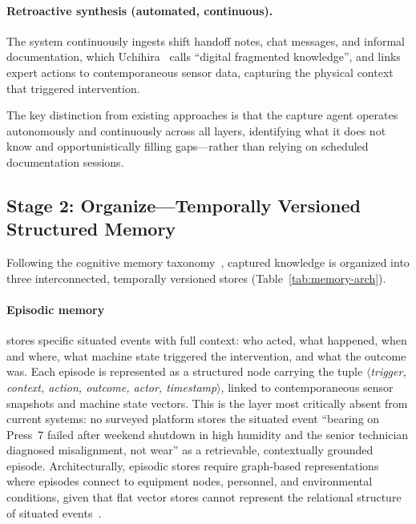 \documentclass[]{ceurart}
\begin{document}
\paragraph{Retroactive synthesis (automated, continuous).} The system continuously ingests
shift handoff notes, chat messages, and informal documentation, which
Uchihira~\cite{uchihira2026} calls ``digital fragmented
knowledge'', and links expert actions to contemporaneous sensor data,
capturing the physical context that triggered intervention.

The key distinction from existing approaches is that the capture agent
operates autonomously and continuously across all layers,
identifying what it does not know and opportunistically filling
gaps---rather than relying on scheduled documentation sessions.

\subsection{Stage 2: Organize---Temporally Versioned Structured
  Memory}\label{sec:organize}

Following the cognitive memory taxonomy~\cite{sumers2024coala}, captured
knowledge is organized into three interconnected, temporally versioned
stores (Table~\ref{tab:memory-arch}).

\paragraph{Episodic memory} stores specific situated events with full
context: who acted, what happened, when and where, what machine state
triggered the intervention, and what the outcome was. Each episode is
represented as a structured node carrying the tuple
$\langle$\textit{trigger, context, action, outcome, actor,
timestamp}$\rangle$, linked to contemporaneous sensor snapshots and
machine state vectors. This is the layer most critically absent from
current systems: no surveyed platform stores the situated event ``bearing
on Press~7 failed after weekend shutdown in high humidity and the senior
technician diagnosed misalignment, not wear'' as a retrievable,
contextually grounded episode. Architecturally, episodic stores require
graph-based representations where episodes connect to equipment nodes,
personnel, and environmental conditions, given that flat vector stores cannot
represent the relational structure of situated
events~\cite{graphmemsurvey2026}.
\end{document}
